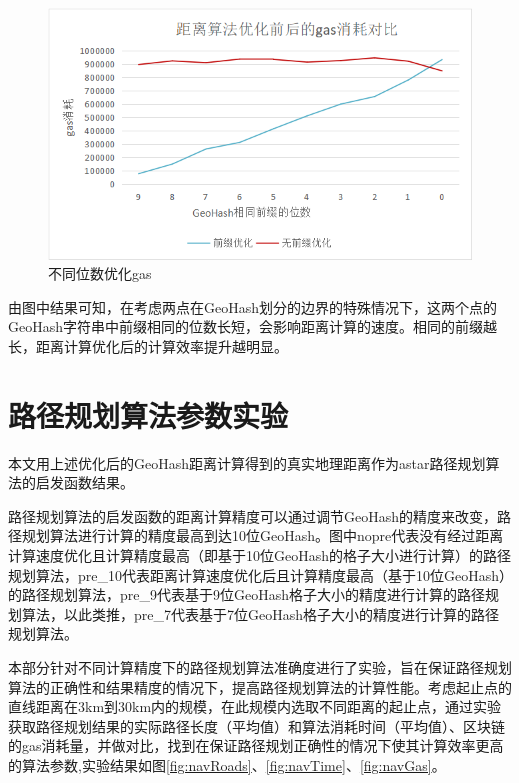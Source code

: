 \begin{figure}
  \centering
  \includegraphics[width=1.0\textwidth]{figures/不同位数优化gas}
  \caption{不同位数优化gas}\label{fig:diffBetterGas}
\end{figure}

由图中结果可知，在考虑两点在GeoHash划分的边界的特殊情况下，这两个点的GeoHash字符串中前缀相同的位数长短，会影响距离计算的速度。相同的前缀越长，距离计算优化后的计算效率提升越明显。

\section{路径规划算法参数实验}
本文用上述优化后的GeoHash距离计算得到的真实地理距离作为astar路径规划算法的启发函数结果。

路径规划算法的启发函数的距离计算精度可以通过调节GeoHash的精度来改变，路径规划算法进行计算的精度最高到达10位GeoHash。图中nopre代表没有经过距离计算速度优化且计算精度最高（即基于10位GeoHash的格子大小进行计算）的路径规划算法，pre\_10代表距离计算速度优化后且计算精度最高（基于10位GeoHash）的路径规划算法，pre\_9代表基于9位GeoHash格子大小的精度进行计算的路径规划算法，以此类推，pre\_7代表基于7位GeoHash格子大小的精度进行计算的路径规划算法。

本部分针对不同计算精度下的路径规划算法准确度进行了实验，旨在保证路径规划算法的正确性和结果精度的情况下，提高路径规划算法的计算性能。考虑起止点的直线距离在3km到30km内的规模，在此规模内选取不同距离的起止点，通过实验获取路径规划结果的实际路径长度（平均值）和算法消耗时间（平均值）、区块链的gas消耗量，并做对比，找到在保证路径规划正确性的情况下使其计算效率更高的算法参数,实验结果如图\ref{fig:navRoads}、\ref{fig:navTime}、\ref{fig:navGas}。

